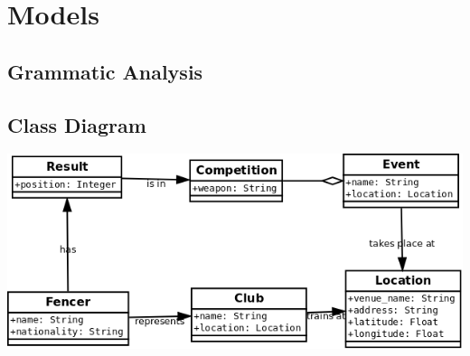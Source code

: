 \chapter{Models}
\section{Grammatic Analysis}
\citep{bf-comp-guide}
\section{Class Diagram}
\includegraphics[width=\textwidth]{class_diagram}